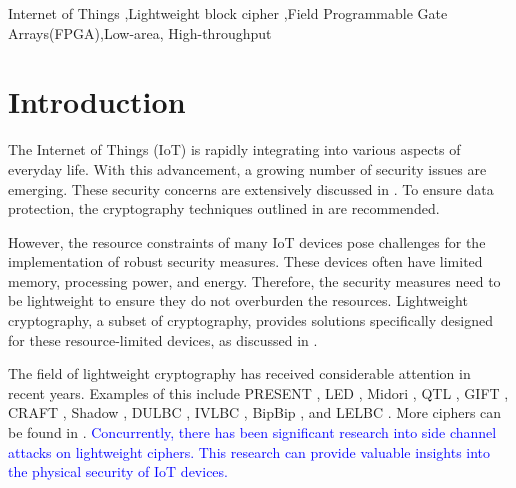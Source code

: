 \documentclass[final,5p,times,twocolumn]{elsarticle}
\begin{document}
\begin{frontmatter}
    \begin{keyword}
        Internet of Things  \sep Lightweight block cipher \sep Field Programmable Gate Arrays(FPGA)\sep  Low-area, High-throughput

    \end{keyword}

\end{frontmatter}




\section{Introduction}\label{sec1}

The Internet of Things (IoT) is rapidly integrating into various aspects of everyday life.
With this advancement, a growing number of security issues are emerging.
These security concerns are extensively discussed in \cite{Meneghello2019a}.
To ensure data protection, the cryptography techniques outlined in \cite{Swessi2022} are recommended.

However, the resource constraints of many IoT devices pose challenges for the implementation of robust security measures. These devices often have limited memory, processing power, and energy. Therefore, the security measures need to be lightweight to ensure they do not overburden the resources. Lightweight cryptography, a subset of cryptography, provides solutions specifically designed for these resource-limited devices, as discussed in \cite{Mohajerani2020}.

The field of lightweight cryptography has received considerable attention in recent years. Examples of this include PRESENT \cite{Bogdanov2007}, LED \cite{Guo2011}, Midori \cite{Banik2015a}, QTL \cite{Li2016}, GIFT \cite{Banik2017}, CRAFT \cite{Beierle2019}, Shadow \cite{Guo2021}, DULBC \cite{Yang2022}, IVLBC \cite{Huang2023}, BipBip \cite{Belkheyar2023}, and LELBC \cite{Song2024}. More ciphers can be found in \cite{Zakaria2023}. \textcolor{blue}{Concurrently, there has been significant research into side channel attacks on lightweight ciphers. This research can provide valuable insights into the physical security of IoT devices.}
\end{document}
